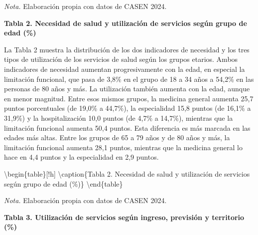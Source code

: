 \documentclass[
  spanish,
  a4paper,
  oneside]{scrbook}
\begin{document}
\emph{Nota.} Elaboración propia con datos de CASEN 2024.

\textbf{Tabla 2. Necesidad de salud y utilización de servicios según
grupo de edad (\%)}

La Tabla 2 muestra la distribución de los dos indicadores de necesidad y
los tres tipos de utilización de los servicios de salud según los grupos
etarios. Ambos indicadores de necesidad aumentan progresivamente con la
edad, en especial la limitación funcional, que pasa de 3,8\% en el grupo
de 18 a 34 años a 54,2\% en las personas de 80 años y más. La
utilización también aumenta con la edad, aunque en menor magnitud. Entre
esos mismos grupos, la medicina general aumenta 25,7 puntos porcentuales
(de 19,0\% a 44,7\%), la especialidad 15,8 puntos (de 16,1\% a 31,9\%) y
la hospitalización 10,0 puntos (de 4,7\% a 14,7\%), mientras que la
limitación funcional aumenta 50,4 puntos. Esta diferencia es más marcada
en las edades más altas. Entre los grupos de 65 a 79 años y de 80 años y
más, la limitación funcional aumenta 28,1 puntos, mientras que la
medicina general lo hace en 4,4 puntos y la especialidad en 2,9 puntos.

\textbackslash begin\{table\}{[}!h{]} \centering
\textbackslash caption\{\label{tab:unnamed-chunk-3}Tabla 2. Necesidad de
salud y utilización de servicios según grupo de edad (\%)\} \centering
{} \textbackslash end\{table\}

\emph{Nota.} Elaboración propia con datos de CASEN 2024.

\textbf{Tabla 3. Utilización de servicios según ingreso, previsión y
territorio (\%)}
\end{document}
